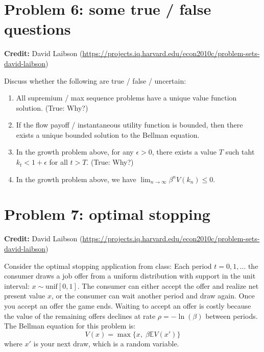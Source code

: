 \documentclass[11pt]{extarticle}
\theoremstyle{plain}
\theoremstyle{definition}
\begin{document}
\vspace{10mm}
\section*{Problem 6: some true / false questions}

\textbf{Credit:} David Laibson (\url{https://projects.iq.harvard.edu/econ2010c/problem-sets-david-laibson})

\vspace{5mm}
\noindent
Discuss whether the following are true / false / uncertain:
\begin{enumerate}
\item All supremium / max sequence problems have a unique value function solution. (True: Why?) 

\item If the flow payoff / instantaneous utility function is bounded, then there exists a unique bounded solution to the Bellman equation. 

\item In the growth problem above, for any $\epsilon > 0$, there exists a value $T$ such taht $k_t < 1 + \epsilon$ for all $t > T$. (True: Why?)

\item In the growth problem above, we have $\lim_{n \to \infty} \beta^n V(k_n) \leq 0$. 
\end{enumerate}




\vspace{10mm}
\section*{Problem 7: optimal stopping}

\textbf{Credit:} David Laibson (\url{https://projects.iq.harvard.edu/econ2010c/problem-sets-david-laibson})

\vspace{5mm}
\noindent
Consider the optimal stopping application from class: Each period $t = 0, 1, \ldots$ the consumer draws a job offer from a uniform distribution with support in the unit interval: $x \sim \text{unif}[0, 1]$. The consumer can either accept the offer and realize net present value $x$, or the consumer can wait another period and draw again. Once you accept an offer the game ends. Waiting to accept an offer is costly because the value of the remaining offers declines at rate $\rho = - \ln(\beta)$ between periods. The Bellman equation for this problem is:
\begin{equation*}
	V(x) = \max \bigg\{ x, \; \beta \mathbb E V(x') \bigg\}
\end{equation*}
where $x'$ is your next draw, which is a random variable.
\end{document}

